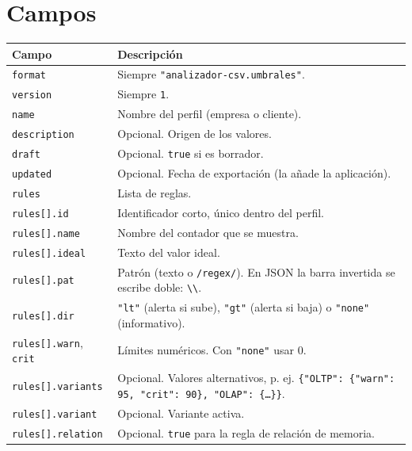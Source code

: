 \documentclass[11pt,a4paper,oneside]{report}
\newcommand{\bs}{\textbackslash}
\begin{document}
\section{Campos}

\begin{center}
\small
\begin{tabularx}{\textwidth}{lX}
  \toprule
  Campo & Descripción \\
  \midrule
  \texttt{format} & Siempre \texttt{"analizador-csv.umbrales"}. \\
  \texttt{version} & Siempre \texttt{1}. \\
  \texttt{name} & Nombre del perfil (empresa o cliente). \\
  \texttt{description} & Opcional. Origen de los valores. \\
  \texttt{draft} & Opcional. \texttt{true} si es borrador. \\
  \texttt{updated} & Opcional. Fecha de exportación (la añade la aplicación). \\
  \texttt{rules} & Lista de reglas. \\
  \midrule
  \texttt{rules[].id} & Identificador corto, único dentro del perfil. \\
  \texttt{rules[].name} & Nombre del contador que se muestra. \\
  \texttt{rules[].ideal} & Texto del valor ideal. \\
  \texttt{rules[].pat} & Patrón (texto o \texttt{/regex/}). En JSON la barra
                         invertida se escribe doble: \texttt{\bs\bs}. \\
  \texttt{rules[].dir} & \texttt{"lt"} (alerta si sube), \texttt{"gt"}
                         (alerta si baja) o \texttt{"none"} (informativo). \\
  \texttt{rules[].warn}, \texttt{crit} & Límites numéricos. Con
                         \texttt{"none"} usar 0. \\
  \texttt{rules[].variants} & Opcional. Valores alternativos, p. ej.
     \texttt{\{"OLTP": \{"warn": 95, "crit": 90\}, "OLAP": \{\ldots\}\}}. \\
  \texttt{rules[].variant} & Opcional. Variante activa. \\
  \texttt{rules[].relation} & Opcional. \texttt{true} para la regla de
                              relación de memoria. \\
  \bottomrule
\end{tabularx}
\end{center}
\end{document}
